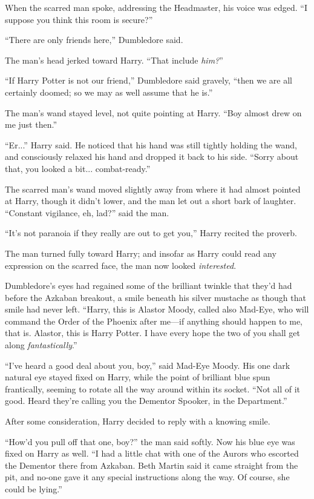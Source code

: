 When the scarred man spoke, addressing the Headmaster, his voice was edged. “I suppose you think this room is secure?”

“There are only friends here,” Dumbledore said.

The man’s head jerked toward Harry. “That include \emph{him?}”

“If Harry Potter is not our friend,” Dumbledore said gravely, “then we are all certainly doomed; so we may as well assume that he is.”

The man’s wand stayed level, not quite pointing at Harry. “Boy almost drew on me just then.”

“Er...” Harry said. He noticed that his hand was still tightly holding the wand, and consciously relaxed his hand and dropped it back to his side. “Sorry about that, you looked a bit... combat-ready.”

The scarred man’s wand moved slightly away from where it had almost pointed at Harry, though it didn’t lower, and the man let out a short bark of laughter. “Constant vigilance, eh, lad?” said the man.

“It’s not paranoia if they really are out to get you,” Harry recited the proverb.

The man turned fully toward Harry; and insofar as Harry could read any expression on the scarred face, the man now looked \emph{interested}.

Dumbledore’s eyes had regained some of the brilliant twinkle that they’d had before the Azkaban breakout, a smile beneath his silver mustache as though that smile had never left. “Harry, this is Alastor Moody, called also Mad-Eye, who will command the Order of the Phoenix after me—if anything should happen to me, that is. Alastor, this is Harry Potter. I have every hope the two of you shall get along \emph{fantastically}.”

“I’ve heard a good deal about you, boy,” said Mad-Eye Moody. His one dark natural eye stayed fixed on Harry, while the point of brilliant blue spun frantically, seeming to rotate all the way around within its socket. “Not all of it good. Heard they’re calling you the Dementor Spooker, in the Department.”

After some consideration, Harry decided to reply with a knowing smile.

“How’d you pull off that one, boy?” the man said softly. Now his blue eye was fixed on Harry as well. “I had a little chat with one of the Aurors who escorted the Dementor there from Azkaban. Beth Martin said it came straight from the pit, and no-one gave it any special instructions along the way. Of course, she could be lying.”

